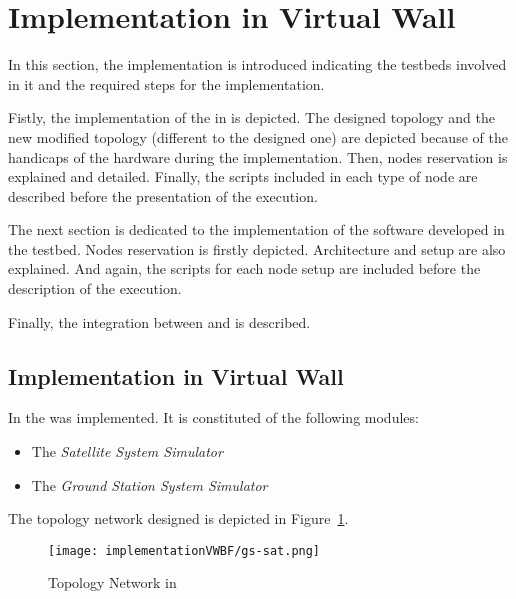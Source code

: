 
\section{Implementation in Virtual Wall}

In this section, the implementation is introduced indicating the testbeds involved in it and the required steps for the implementation.

Fistly, the implementation of the \sss in \vw is depicted. The designed topology and the new
modified topology (different to the designed one) are depicted because of the handicaps of
the hardware during the implementation. Then, nodes reservation is
explained and detailed. Finally, the scripts included in each type of
node are described before the presentation of the execution.

The next section is dedicated to the implementation of the software
developed in the \bonfire testbed. Nodes reservation is firstly
depicted. Architecture and setup are also explained. And again, the
scripts for each node setup are included before the description of the
execution.

Finally, the integration between \vw and \bonfire is described.






\subsection{Implementation in Virtual Wall}

In \vw the \sss was implemented. It is constituted of the
following modules:
\begin{itemize}
\item The \emph{Satellite System Simulator}
\item The \emph{Ground Station System Simulator}
\end{itemize}
The topology network designed is depicted in Figure~\ref{fig:impl-topology-vw}.

\begin{figure}[!h]
\begin{center}
\texttt{[image: implementationVWBF/gs-sat.png]}

\caption{Topology Network in \vw}
\label{fig:impl-topology-vw}
\end{center}
\end{figure}



